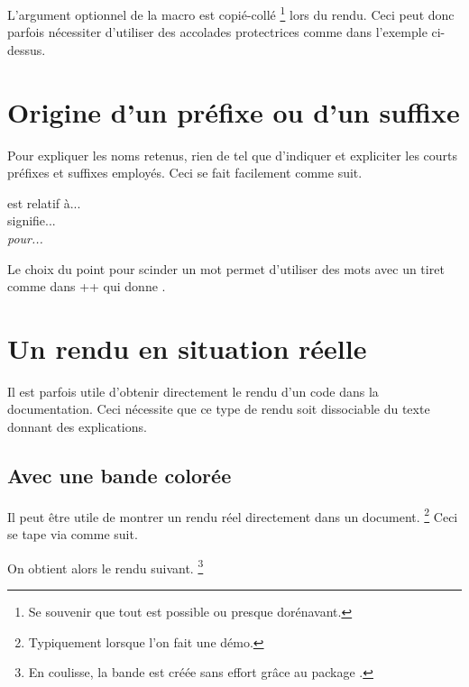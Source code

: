 \begin{tdocwarn}
    L'argument optionnel de la macro  est copié-collé
    \footnote{
        Se souvenir que tout est possible ou presque dorénavant.
    }
    lors du rendu. Ceci peut donc parfois nécessiter d'utiliser des accolades protectrices comme dans l'exemple ci-dessus.
\end{tdocwarn}



\section{Origine d'un préfixe ou d'un suffixe}

Pour expliquer les noms retenus, rien de tel que d'indiquer et expliciter les courts préfixes et suffixes employés. Ceci se fait facilement comme suit.


\begin{tdoclatex}[sbs]
 est relatif à...    \\
 signifie... \\
\emph{ pour...}
\end{tdoclatex}


\begin{tdocrem}
    Le choix du point pour scinder un mot permet d'utiliser des mots avec un tiret comme dans \tdoclatexin++ qui donne .
\end{tdocrem}


\section{Un rendu en situation réelle}
\label{tutodoc-showcase}

Il est parfois utile d'obtenir directement le rendu d'un code dans la documentation. Ceci nécessite que ce type de rendu soit dissociable du texte donnant des explications.



\subsection{Avec une bande colorée}

\begin{tdocexa}
    Il peut être utile de montrer un rendu réel directement dans un document.
    \footnote{
        Typiquement lorsque l'on fait une démo.
    }
    Ceci se tape via  comme suit.



    On obtient alors le rendu suivant.
    \footnote{
        En coulisse, la bande est créée sans effort grâce au package .
    }

    \medskip

    

\end{tdocexa}


